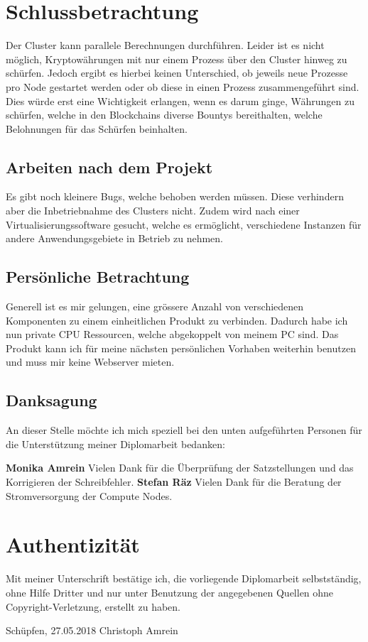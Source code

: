 \section{Schlussbetrachtung} 
\label{sec:Schlussbetrachtung}
Der Cluster kann parallele Berechnungen durchführen. Leider ist es nicht möglich, Kryptowährungen mit nur einem Prozess über den Cluster hinweg zu schürfen. Jedoch ergibt es hierbei keinen Unterschied, ob jeweils neue Prozesse pro Node gestartet werden oder ob diese in einen Prozess zusammengeführt sind. Dies würde erst eine Wichtigkeit erlangen, wenn es darum ginge, Währungen zu schürfen, welche in den Blockchains diverse Bountys bereithalten, welche Belohnungen für das Schürfen beinhalten.

\subsection{Arbeiten nach dem Projekt}
Es gibt noch kleinere Bugs, welche behoben werden müssen. Diese verhindern aber die Inbetriebnahme des Clusters nicht. Zudem wird nach einer Virtualisierungssoftware gesucht, welche es ermöglicht, verschiedene Instanzen für andere Anwendungsgebiete in Betrieb zu nehmen.

\subsection{Persönliche Betrachtung}
Generell ist es mir gelungen, eine grössere Anzahl von verschiedenen Komponenten zu einem einheitlichen Produkt zu verbinden. Dadurch habe ich nun private CPU Ressourcen, welche abgekoppelt von meinem PC sind. Das Produkt kann ich für meine nächsten persönlichen Vorhaben weiterhin benutzen und muss mir keine Webserver mieten.
 
\subsection{Danksagung}
An dieser Stelle möchte ich mich speziell bei den unten aufgeführten Personen für die Unterstützung meiner Diplomarbeit bedanken:

\textbf{Monika Amrein}\newline
Vielen Dank für die Überprüfung der Satzstellungen und das Korrigieren der Schreibfehler.\newline
\textbf{Stefan Räz}\newline
Vielen Dank für die Beratung der Stromversorgung der Compute Nodes.


\section{Authentizität}
Mit meiner Unterschrift bestätige ich, die vorliegende Diplomarbeit selbstständig, ohne Hilfe Dritter und nur unter Benutzung der angegebenen Quellen ohne Copyright-Verletzung, erstellt zu haben.

Schüpfen, 27.05.2018\newline
\newline
\newline
Christoph Amrein

